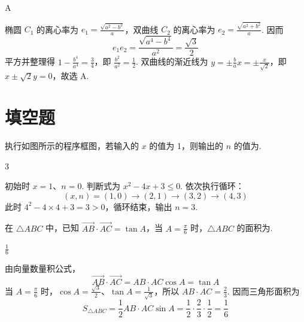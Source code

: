 \begin{answer}
A
\end{answer}

\begin{solution}
椭圆 \(C_1\) 的离心率为 \(e_1=\frac{\sqrt{a^2-b^2}}a\)，双曲线 \(C_2\) 的离心率为 \(e_2=\frac{\sqrt{a^2+b^2}}a\). 因而
\[
e_1e_2=\frac{\sqrt{a^4-b^4}}{a^2}=\frac{\sqrt3}{2}
\]
平方并整理得 \(1-\frac{b^4}{a^4}=\frac34\)，即 \(\frac{b^2}{a^2}=\frac12\). 双曲线的渐近线为
\(y=\pm\frac ba x=\pm\frac{x}{\sqrt2}\)，即 \(x\pm\sqrt2y=0\)，故选 A.
\end{solution}

\section{填空题}

\begin{problem}
执行如图所示的程序框图，若输入的 \(x\) 的值为 1，则输出的 \(n\) 的值为\fillinblank{}.

\end{problem}

\begin{answer}
\(3\)
\end{answer}

\begin{solution}
初始时 \(x=1\)、\(n=0\). 判断式为 \(x^2-4x+3\leqslant0\). 依次执行循环：
\[
(x,n)=(1,0)\to(2,1)\to(3,2)\to(4,3)
\]
此时 \(4^2-4\times4+3=3>0\)，循环结束，输出 \(n=3\).
\end{solution}

\begin{problem}
在 \(\triangle ABC\) 中，已知 \(\overrightarrow{AB} \cdot \overrightarrow{AC} = \tan A\)，当 \(A = \frac{\pi}{6}\) 时，\(\triangle ABC\) 的面积为\fillinblank{}.
\end{problem}

\begin{answer}
\(\frac{1}{6}\)
\end{answer}

\begin{solution}
由向量数量积公式，
\[
\overrightarrow{AB}\cdot\overrightarrow{AC}=AB\cdot AC\cos A=\tan A
\]
当 \(A=\frac\pi6\) 时，\(\cos A=\frac{\sqrt3}{2}\)、\(\tan A=\frac1{\sqrt3}\)，所以
\(AB\cdot AC=\frac{2}{3}\). 因而三角形面积为
\[
S_{\triangle ABC}=\frac12AB\cdot AC\sin A
=\frac12\cdot\frac23\cdot\frac12=\frac16
\]
\end{solution}

